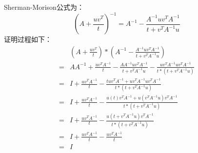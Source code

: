 Sherman-Morison公式为：
\begin{displaymath}
(A+\frac{uv^T}{t})^{-1} = A^{-1} - \frac{A^{-1}uv^TA^{-1}}{t+v^TA^{-1}u} 
\end{displaymath}
证明过程如下：
\begin{displaymath}
\begin{split}
&(A+\frac{uv^T}{t})*( A^{-1} - \frac{A^{-1}uv^TA^{-1}}{t+v^TA^{-1}u})\\
=&AA^{-1} + \frac{uv^TA^{-1}}{t} - \frac{AA^{-1}uv^TA^{-1}}{t+v^TA^{-1}u}-\frac{uv^TA^{-1}uv^TA^{-1}}{t*(t+v^TA^{-1}u)}\\
=&I + \frac{uv^TA^{-1}}{t} -\frac{tuv^TA^{-1} + uv^TA^{-1}uv^TA^{-1}}{t*(t+v^TA^{-1}u)}\\
=& I + \frac{uv^TA^{-1}}{t} -\frac{u(t)v^TA^{-1} + u(v^TA^{-1}u)v^TA^{-1}}{t*(t+v^TA^{-1}u)}\\
=& I + \frac{uv^TA^{-1}}{t} -\frac{u(t+v^TA^{-1}u)v^TA^{-1}}{t*(t+v^TA^{-1}u)}\\
=& I + \frac{uv^TA^{-1}}{t} -\frac{uv^TA^{-1}}{t}\\
=& I
\end{split}
\end{displaymath}

